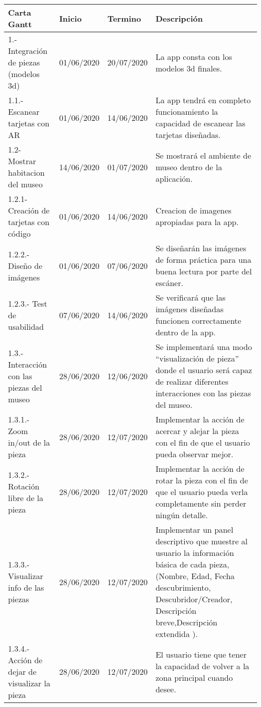 \begin{longtable}{| p{}| p{}| p{}| p{}|}
\hline 
	Carta Gantt & 
	Inicio & 
	Termino	& 
	Descripción
\\ 
\hline 
	1.- Integración de piezas (modelos 3d) &
	01/06/2020 &
	20/07/2020 & 
	La app consta con los modelos 3d finales.
\\ 
\hline 
	1.1.- Escanear tarjetas con AR &
 	01/06/2020 & 
 	14/06/2020 & 
	La app tendrá en completo funcionamiento la capacidad de escanear las tarjetas diseñadas.
\\ 
\hline 
	1.2-  Mostrar habitacion del museo &
	14/06/2020 &
	01/07/2020 & 
	Se mostrará el ambiente de museo dentro de la aplicación.
	\\ 
\hline 
	1.2.1- Creación de tarjetas con código &
	01/06/2020 &
	14/06/2020 & 
	Creacion de imagenes apropiadas para la app.
	\\
\hline 
	1.2.2.- Diseño de imágenes &
	01/06/2020 &
	07/06/2020 &
	Se diseñarán las imágenes de forma práctica para una buena lectura por parte del escáner.
\\
\hline 
	1.2.3.- Test de usabilidad &
	07/06/2020 &
	14/06/2020 & 
	Se verificará que las imágenes diseñadas funcionen correctamente dentro de la app.
\\ 
\hline 
	1.3.- Interacción con las piezas del museo &
	28/06/2020 &
	12/06/2020 & 
	Se implementará una modo “visualización de pieza” donde el usuario será capaz de realizar diferentes interacciones con las piezas del museo.
\\
\hline 
	1.3.1.- Zoom in/out de la pieza &
	28/06/2020 &
	12/07/2020 & 
	Implementar la acción de acercar y alejar la pieza con el fin de que el usuario pueda observar mejor.
\\
\hline 
	1.3.2.- Rotación libre de la pieza &
	28/06/2020 &
	12/07/2020 & 
	Implementar la acción de rotar la pieza con el fin de que el usuario pueda verla completamente sin perder ningún detalle.
	\\
\hline 
	1.3.3.- Visualizar info de las piezas &
	28/06/2020 &
	12/07/2020 &
	Implementar un panel descriptivo que muestre al usuario la información básica de cada pieza, (Nombre, Edad, Fecha descubrimiento, Descubridor/Creador, Descripción breve,Descripción extendida ).
\\
\hline 
	1.3.4.- Acción de dejar de visualizar la pieza &
	28/06/2020 &
	12/07/2020 &
	El usuario tiene que tener la capacidad de volver a la zona principal cuando desee.
\\

\end{longtable}
